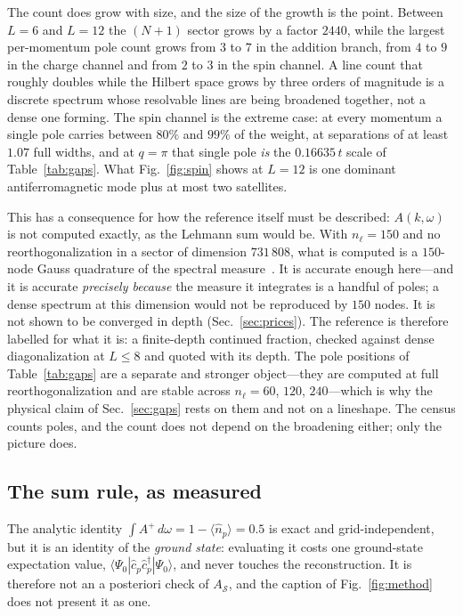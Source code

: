 The count does grow with size, and the size of the growth is the point. Between $L=6$ and $L=12$ the
$(N{+}1)$ sector grows by a factor $2440$, while the largest per-momentum pole count grows from $3$ to
$7$ in the addition branch, from $4$ to $9$ in the charge channel and from $2$ to $3$ in the spin
channel. A line count that roughly doubles while the Hilbert space grows by three
orders of magnitude is a discrete spectrum whose resolvable lines are being broadened together, not a
dense one forming. The spin channel is the extreme case: at every momentum a single pole carries
between $80\%$ and $99\%$ of the weight, at separations of at least $1.07$ full widths, and at $q=\pi$
that single pole \emph{is} the $0.16635\,t$ scale of Table~\ref{tab:gaps}. What Fig.~\ref{fig:spin}
shows at $L=12$ is one dominant antiferromagnetic mode plus at most two satellites.

This has a consequence for how the reference itself must be described: $A(k,\omega)$ is not computed exactly, as the Lehmann sum would be. With $n_\ell=150$ and no reorthogonalization in a sector of dimension $731\,808$, what
is computed is a $150$-node Gauss quadrature of the spectral measure~\cite{haydock1972,golub2010}. It
is accurate enough here---and it is accurate \emph{precisely because} the measure it integrates is a
handful of poles; a dense spectrum at this dimension would not be reproduced by $150$ nodes. It is not
shown to be converged in depth (Sec.~\ref{sec:prices}). The reference is therefore labelled for what it is: a finite-depth continued
fraction, checked against dense diagonalization at $L\le8$ and quoted with its depth. The pole
positions of Table~\ref{tab:gaps} are a separate and stronger object---they are computed at full
reorthogonalization and are stable across $n_\ell=60$, $120$, $240$---which is why the physical claim
of Sec.~\ref{sec:gaps} rests on them and not on a lineshape. The census counts poles, and the count
does not depend on the broadening either; only the picture does.

\subsection{The sum rule, as measured}

The analytic identity $\int A^{+}\,d\omega = 1-\langle\hat n_p\rangle = 0.5$ is exact and
grid-independent, but it is an identity of the \emph{ground state}: evaluating it costs one
ground-state expectation value, $\langle\Psi_0|\hat c_p\hat c^{\dagger}_p|\Psi_0\rangle$, and never
touches the reconstruction. It is therefore not an a posteriori check of $A_{\mathcal S}$, and the caption of Fig.~\ref{fig:method} does not present it as one.

